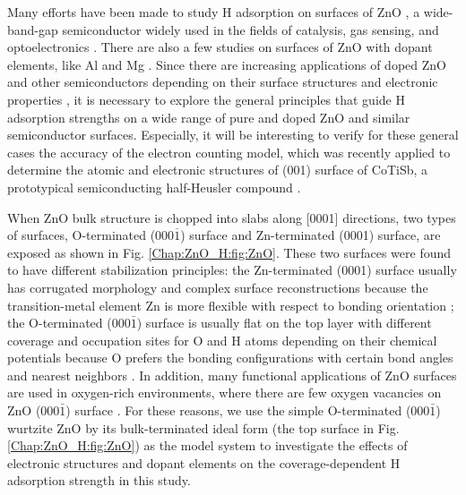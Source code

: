 Many efforts have been made to study H adsorption on surfaces of ZnO \cite{Meyer03,meyer2004first,wang2005hydrogen,valtiner2009temperature,lauritsen2011stabilization, wahl2013stabilization, Jacobs16ZnO}, a wide-band-gap semiconductor widely used in the fields of catalysis, gas sensing, and optoelectronics \cite{Ozgur05_ZnO,Klingshirn07_ZnO}. There are also a few studies on surfaces of ZnO with dopant elements, like Al and Mg \cite{lin2009first, lahmer2015effect}. Since there are increasing applications of doped ZnO and other semiconductors depending on their surface structures and electronic properties \cite{Pan08_doped_ZnO, Georgekutty08_Ag_ZnO, lin2009first, Ling11_Sn-Doped, Buonsanti11_Al_ZnO, Kim14_doped, Hsu14_Ag_ZnO, Lin17_Ni_SnO2}, it is necessary to explore the general principles that guide H adsorption strengths on a wide range of pure and doped ZnO and similar semiconductor surfaces. Especially, it will be interesting to verify for these general cases the accuracy of the electron counting model, which was recently applied to determine the atomic and electronic structures of (001) surface of CoTiSb, a prototypical semiconducting half-Heusler compound \cite{kawasaki2018simple}.

When ZnO bulk structure is chopped into slabs along [0001] directions, two types of surfaces, O-terminated (000$\overline{1}$) surface and Zn-terminated  (0001) surface, are exposed as shown in Fig. \ref{Chap:ZnO_H:fig:ZnO}. These two surfaces were found to have different stabilization principles\cite{lauritsen2011stabilization}: the Zn-terminated  (0001) surface usually has corrugated morphology and complex surface reconstructions because the transition-metal element Zn is more flexible with respect to bonding orientation \cite{dulub2003novel,woll2007chemistry}; the O-terminated (000$\bar{1}$) surface is usually flat on the top layer with different coverage and occupation sites for O and H atoms depending on their chemical potentials because O prefers the bonding configurations with certain bond angles and nearest neighbors \cite{meyer2004first,lauritsen2011stabilization}. In addition, many functional applications of ZnO surfaces are used in oxygen-rich environments, where there are few oxygen vacancies on ZnO (000$\bar{1}$) surface \cite{meyer2004first,lauritsen2011stabilization,wahl2013stabilization}. For these reasons, we use the simple O-terminated (000$\bar{1}$) wurtzite ZnO by its bulk-terminated ideal form (the top surface in Fig. \ref{Chap:ZnO_H:fig:ZnO}) as the model system to investigate the effects of electronic structures and dopant elements on the coverage-dependent H adsorption strength in this study.

